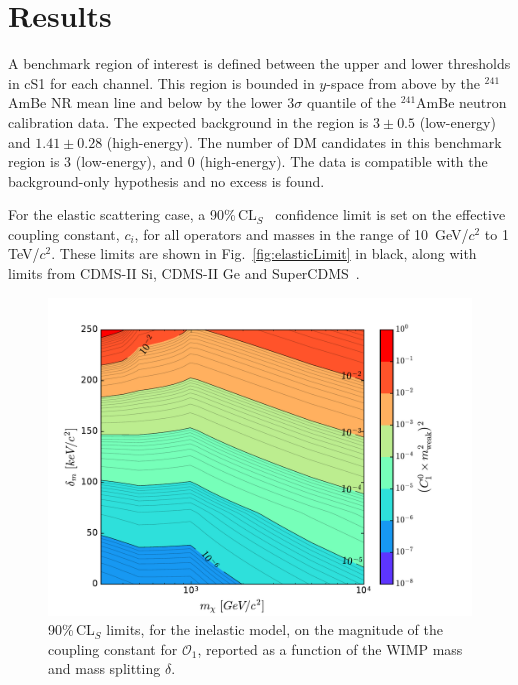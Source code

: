 \section{Results}

A benchmark region of interest is defined between the upper and lower thresholds in cS1 for each channel. This region
is bounded in $y$-space from above by the $^{241}$AmBe NR mean line and below by the lower 3$\sigma$ quantile of the $^{241}$AmBe neutron calibration data. The expected background in the region is $3 \pm 0.5$ (low-energy) and $1.41 \pm 0.28$ (high-energy). The number of DM candidates in this benchmark region is 3 (low-energy), and 0 (high-energy). The data is compatible with the background-only hypothesis and no excess is found. 

For the elastic scattering case, a 90\%\,CL$_S$~\cite{cls} confidence limit is set on the effective coupling constant, $c_i$,  for all operators and masses in the range of 10~GeV/$c^2$ to 1 TeV/$c^2$. 
These limits are shown in Fig.~\ref{fig:elasticLimit} in black, along with limits from CDMS-II Si, CDMS-II Ge and SuperCDMS~\cite{CDMSEFT}.  

\begin{figure}
\centerline{\includegraphics[width=1.\linewidth]{Figures/O1_inelastic_lim_2D}}
\caption{90\%\,CL$_S$ limits, for the inelastic model, on the magnitude of the coupling constant for $\mathcal{O}_1$, reported as a function of the WIMP mass and mass splitting $\delta$.}
\label{fig:O1Inel}
\end{figure}  

